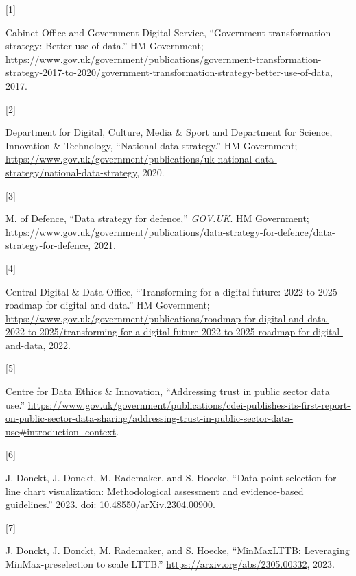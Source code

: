\documentclass{article}
\newlength{\cslhangindent}
\newlength{\csllabelwidth}
\newlength{\cslentryspacingunit} %
\newenvironment{CSLReferences}[2] %
 {%
  \setlength{\parindent}{0pt}
  \ifodd #1
  \let\oldpar\par
  \def\par{\hangindent=\cslhangindent\oldpar}
  \fi
  \setlength{\parskip}{#2\cslentryspacingunit}
 }%
 {}
\newcommand{\CSLLeftMargin}[1]{\parbox[t]{\csllabelwidth}{#1}}
\newcommand{\CSLRightInline}[1]{\parbox[t]{\linewidth - \csllabelwidth}{#1}\break}
\begin{document}
\hypertarget{refs}{}
\begin{CSLReferences}{0}{0}
\leavevmode{}%
\CSLLeftMargin{{[}1{]} }
\CSLRightInline{Cabinet Office and Government Digital Service,
{``Government transformation strategy: Better use of data.''} HM
Government;
\url{https://www.gov.uk/government/publications/government-transformation-strategy-2017-to-2020/government-transformation-strategy-better-use-of-data},
2017.}

\leavevmode{}%
\CSLLeftMargin{{[}2{]} }
\CSLRightInline{Department for Digital, Culture, Media \& Sport and
Department for Science, Innovation \& Technology, {``National data
strategy.''} HM Government;
\url{https://www.gov.uk/government/publications/uk-national-data-strategy/national-data-strategy},
2020.}

\leavevmode{}%
\CSLLeftMargin{{[}3{]} }
\CSLRightInline{M. of Defence, {``Data strategy for defence,''}
\emph{GOV.UK}. HM Government;
\url{https://www.gov.uk/government/publications/data-strategy-for-defence/data-strategy-for-defence},
2021.}

\leavevmode{}%
\CSLLeftMargin{{[}4{]} }
\CSLRightInline{Central Digital \& Data Office, {``Transforming for a
digital future: 2022 to 2025 roadmap for digital and data.''} HM
Government;
\url{https://www.gov.uk/government/publications/roadmap-for-digital-and-data-2022-to-2025/transforming-for-a-digital-future-2022-to-2025-roadmap-for-digital-and-data},
2022.}

\leavevmode{}%
\CSLLeftMargin{{[}5{]} }
\CSLRightInline{Centre for Data Ethics \& Innovation, {``Addressing
trust in public sector data use.''}
\url{https://www.gov.uk/government/publications/cdei-publishes-its-first-report-on-public-sector-data-sharing/addressing-trust-in-public-sector-data-use\#introduction--context}.}

\leavevmode{}%
\CSLLeftMargin{{[}6{]} }
\CSLRightInline{J. Donckt, J. Donckt, M. Rademaker, and S. Hoecke,
{``Data point selection for line chart visualization: Methodological
assessment and evidence-based guidelines.''} 2023. doi:
\href{https://doi.org/10.48550/arXiv.2304.00900}{10.48550/arXiv.2304.00900}.}

\leavevmode{}%
\CSLLeftMargin{{[}7{]} }
\CSLRightInline{J. Donckt, J. Donckt, M. Rademaker, and S. Hoecke,
{``MinMaxLTTB: Leveraging MinMax-preselection to scale LTTB.''}
\url{https://arxiv.org/abs/2305.00332}, 2023.}


\end{CSLReferences}
\end{document}
